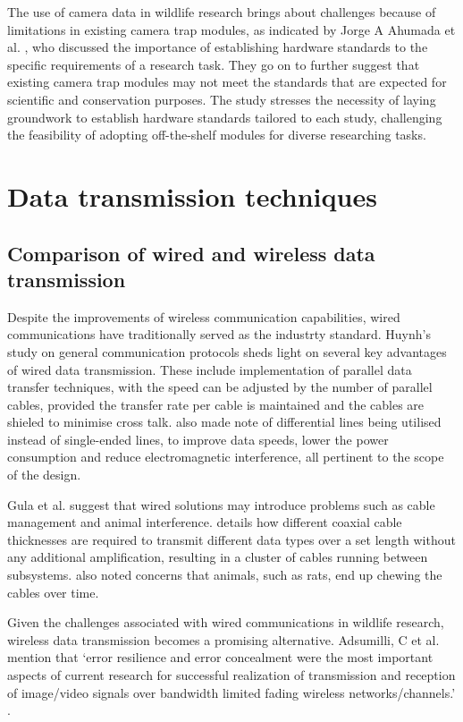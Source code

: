 \documentclass[class=report,11pt,crop=false]{standalone}
\begin{document}
The use of camera data in wildlife research brings about challenges because of limitations in existing camera trap modules, as indicated by Jorge A Ahumada et al. \cite{ahumada2020wildlife}, who discussed the importance of establishing hardware standards to the specific requirements of a research task. They go on to further suggest that existing camera trap modules may not meet the standards that are expected for scientific and conservation purposes. The study stresses the necessity of laying groundwork to establish hardware standards tailored to each study, challenging the feasibility of adopting off-the-shelf modules for diverse researching tasks. 


\section{Data transmission techniques}

\subsection{Comparison of wired and wireless data transmission}

Despite the improvements of wireless communication capabilities, wired communications have traditionally served as the industrty standard. Huynh’s study on general communication protocols \cite{huynh2010study} sheds light on several key advantages of wired data transmission. These include implementation of parallel data transfer techniques, with the speed can be adjusted by the number of parallel cables, provided the transfer rate per cable is maintained and the cables are shieled to minimise cross talk. \cite{huynh2010study} also made note of differential lines being utilised instead of single-ended lines, to improve data speeds, lower the power consumption and reduce electromagnetic interference, all pertinent to the scope of the design.

Gula et al. suggest that wired solutions may introduce problems such as cable management and animal interference. \cite{gula2010audio} details how different coaxial cable thicknesses are required to transmit different data types over a set length without any additional amplification, resulting in a cluster of cables running between subsystems. \cite{gula2010audio} also noted concerns that animals, such as rats, end up chewing the cables over time. 

Given the challenges associated with wired communications in wildlife research, wireless data transmission becomes a promising alternative. Adsumilli, C et al.  mention that ‘error resilience and error concealment were the most important aspects of current research for successful realization of transmission and reception of image/video signals over bandwidth limited fading wireless networks/channels.’ \cite{adsumilli2002adaptive}. %
\end{document}
